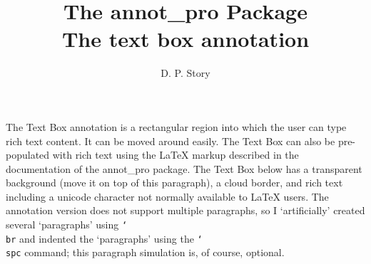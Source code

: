 \documentclass[12pt]{article}
\title{The \textsf{annot\_pro} Package\texorpdfstring{\\[2ex]}{: }The text box annotation}
\author{D. P. Story}
\newcommand{\cs}[1]{\texttt{\char`\\#1}}
\begin{document}
\maketitle

The \textsf{Text Box} annotation is a rectangular region into which the user
can type rich text content. It can be moved around easily. The \textsf{Text
Box} can also be pre-populated with rich text using the {\LaTeX} markup
described in the documentation of the \textsf{annot\_pro} package. The
\textsf{Text Box} below has a transparent background (move it on top of this
paragraph), a cloud border, and rich text including a unicode character not
normally available to {\LaTeX} users. The annotation version does not support
multiple paragraphs, so I `artificially' created several `paragraphs' using
\cs{br} and indented the `paragraphs' using the \cs{spc} command; this
paragraph simulation is, of course, optional.
\begin{center}
\end{center}
\end{document}
